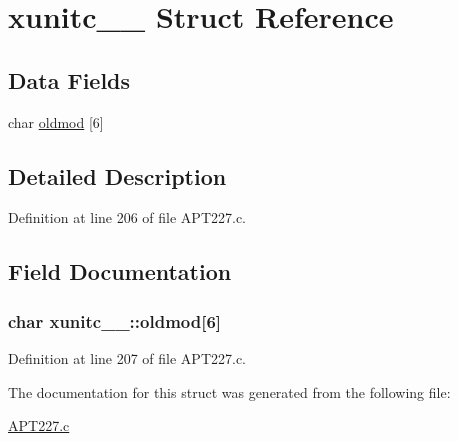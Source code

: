 \hypertarget{structxunitc__1__}{}\section{xunitc\+\_\+\_\+ Struct Reference}
\label{structxunitc__1__}
\subsection*{Data Fields}
\begin{DoxyCompactItemize}
\item 
char \hyperlink{structxunitc__1___a6bfa849c9ed38c11861f964348f3e1dd}{oldmod} \mbox{[}6\mbox{]}
\end{DoxyCompactItemize}


\subsection{Detailed Description}


Definition at line 206 of file A\+P\+T227.\+c.



\subsection{Field Documentation}
\subsubsection[{\texorpdfstring{oldmod}{oldmod}}]{\setlength{\rightskip}{0pt plus 5cm}char xunitc\+\_\+\_\+\+::oldmod\mbox{[}6\mbox{]}}\hypertarget{structxunitc__1___a6bfa849c9ed38c11861f964348f3e1dd}{}\label{structxunitc__1___a6bfa849c9ed38c11861f964348f3e1dd}


Definition at line 207 of file A\+P\+T227.\+c.



The documentation for this struct was generated from the following file\+:\begin{DoxyCompactItemize}
\item 
\hyperlink{APT227_8c}{A\+P\+T227.\+c}\end{DoxyCompactItemize}
